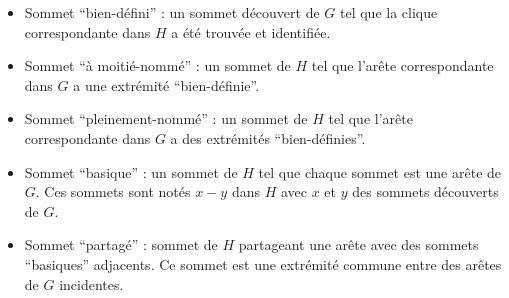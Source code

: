 \begin{itemize}
	\item Sommet ``bien-d\'efini'' : un sommet d\'ecouvert de $G$ tel que la clique correspondante dans $H$ a \'et\'e trouv\'ee et identifi\'ee.
	\item Sommet ``\`a moiti\'e-nomm\'e'' :  un sommet de $H$ tel que  l'ar\^ete correspondante dans $G$ a une extr\'emit\'e  ``bien-d\'efinie''. 
	\item Sommet ``pleinement-nomm\'e'' : un sommet de $H$ tel que l'ar\^ete correspondante dans $G$  a des extr\'emit\'es ``bien-d\'efinies''.
	\item Sommet ``basique'' : un sommet de $H$ tel que chaque sommet est une ar\^ete de $G$. Ces sommets sont not\'es $x-y$ dans $H$ avec $x$ et $y$ des sommets d\'ecouverts de $G$.
	\item Sommet ``partag\'e'' : sommet de $H$ partageant une ar\^ete avec des sommets ``basiques'' adjacents. Ce sommet est une extr\'emit\'e commune entre des ar\^etes de $G$ incidentes. 
\end{itemize}


